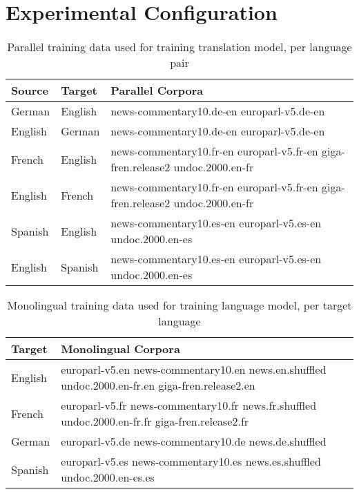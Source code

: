\documentclass[11pt]{article}
\begin{document}
\section{Experimental Configuration}
\label{Design}

\begin{table*}[htb]
\begin{center}
\begin{tabular}{|l|l|l|}
\hline
\bf Source & \bf Target & \bf Parallel Corpora \\ \hline
German & English & news-commentary10.de-en europarl-v5.de-en \\ \hline
English & German & news-commentary10.de-en europarl-v5.de-en \\ \hline
French & English & news-commentary10.fr-en europarl-v5.fr-en giga-fren.release2 undoc.2000.en-fr \\ \hline
English & French & news-commentary10.fr-en europarl-v5.fr-en giga-fren.release2 undoc.2000.en-fr \\ \hline
Spanish & English & news-commentary10.es-en europarl-v5.es-en undoc.2000.en-es \\ \hline
English & Spanish & news-commentary10.es-en europarl-v5.es-en undoc.2000.en-es  \\ \hline
\end{tabular}
\end{center}
\caption{Parallel training data used for training translation model, per language pair}
\label{parallelCorpora}
\end{table*}

\begin{table*}[htb]
\begin{center}
\begin{tabular}{|l|l|}
\hline
\bf Target & \bf Monolingual Corpora \\ \hline
English & europarl-v5.en news-commentary10.en news.en.shuffled undoc.2000.en-fr.en giga-fren.release2.en \\ \hline
French & europarl-v5.fr news-commentary10.fr news.fr.shuffled undoc.2000.en-fr.fr giga-fren.release2.fr \\ \hline
German & europarl-v5.de news-commentary10.de news.de.shuffled \\ \hline
Spanish & europarl-v5.es news-commentary10.es news.es.shuffled undoc.2000.en-es.es\\ \hline
\end{tabular}
\end{center}
\caption{Monolingual training data used for training language model, per target language}
\label{monolingualCorpora}
\end{table*}
\end{document}
